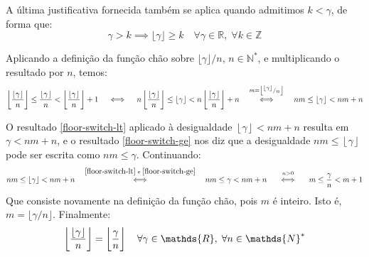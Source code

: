A última justificativa fornecida
também se aplica quando admitimos $k < \gamma$,
de forma que:
\begin{equation}\label{floor-lt2ge-int}
  \gamma > k
  \implies
  \lfloor \gamma \rfloor \ge k
  \quad \forall \gamma \in \mathds{R}, \; \forall k \in \mathds{Z}
\end{equation}

Aplicando a definição da função chão
sobre $\lfloor \gamma \rfloor / n$, $n \in \mathds{N}^*$,
e multiplicando o resultado por $n$, temos:
\[
      \left\lfloor \dfrac{\lfloor \gamma \rfloor}{n} \right\rfloor
    \le
      \dfrac{\left\lfloor \gamma \right\rfloor}{n}
    <
      \left\lfloor \dfrac{\lfloor \gamma \rfloor}{n} \right\rfloor
      + 1
  \quad\iff\quad
      n \left\lfloor \dfrac{\lfloor \gamma \rfloor}{n} \right\rfloor
    \le
      \left\lfloor \gamma \right\rfloor
    <
      n \left\lfloor \dfrac{\lfloor \gamma \rfloor}{n} \right\rfloor
      + n
  \quad\stackfirst{
    m =
    \left\lfloor
      {}^{\scriptstyle\lfloor \gamma \rfloor} / {}_{\scriptstyle n}
    \right\rfloor
  }{\iff}\quad
    n m \le \left\lfloor \gamma \right\rfloor < n m + n
\]

O resultado \eqref{floor-switch-lt}
aplicado à desigualdade $\left\lfloor \gamma \right\rfloor < n m + n$
resulta em $\gamma < n m + n$,
e o resultado \eqref{floor-switch-ge} nos diz que
a desigualdade $n m \le \left\lfloor \gamma \right\rfloor$
pode ser escrita como $n m \le \gamma$.
Continuando:
\[
  n m \le \left\lfloor \gamma \right\rfloor < n m + n
  \quad\stackfirst{\eqref{floor-switch-lt}\text{ e }
                   \eqref{floor-switch-ge}}{\iff}\quad
  n m \le \gamma < n m + n
  \quad\stackfirst{n > 0}{\iff}\quad
  m \le \dfrac{\gamma}{n} < m + 1
\]
Que consiste novamente na definição da função chão, pois $m$ é inteiro.
Isto é, $m = \lfloor \gamma / n \rfloor$.
Finalmente:
\begin{equation}\label{floor-nested-ratio}
  \left\lfloor \dfrac{\lfloor \gamma \rfloor}{n} \right\rfloor
  =
  \left\lfloor \dfrac{\gamma\vphantom{l}}{n} \right\rfloor
  \quad \forall \gamma \in \mathds{R}, \; \forall n \in \mathds{N}^*
\end{equation}
